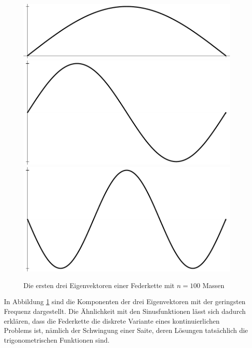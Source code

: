 \begin{figure}
\begin{center}
\includegraphics[width=\hsize]{images/e-12}\\
\includegraphics[width=\hsize]{images/e-13}\\
\includegraphics[width=\hsize]{images/e-14}
\end{center}
\caption{Die ersten drei Eigenvektoren einer Federkette mit $n=100$
Massen\label{eigenvektoren-n100}}
\end{figure}
In Abbildung \ref{eigenvektoren-n100} sind die Komponenten der drei
Eigenvektoren mit der geringsten Frequenz dargestellt.
Die Ähnlichkeit mit den Sinusfunktionen lässt sich dadurch erklären,
dass die Federkette die diskrete Variante eines kontinuierlichen
Problems ist, nämlich der Schwingung einer Saite, deren Lösungen
tatsächlich die trigonometrischen Funktionen sind.

